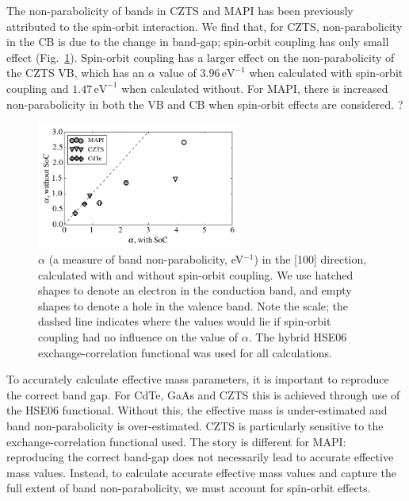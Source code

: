The non-parabolicity of bands in CZTS\autocite{Ito2015} and MAPI\autocite{Brivio2014,Mosconi2017} has been previously attributed to the spin-orbit interaction. 
We find that, for CZTS, non-parabolicity in the CB is due to the change in band-gap; spin-orbit coupling has only small effect (Fig.\ \ref{alpha_SoC}). 
Spin-orbit coupling has a larger effect on the non-parabolicity of the CZTS VB, which has an $\alpha$ value of $3.96\,\textrm{eV}^{-1}$ when calculated with spin-orbit coupling and $1.47\,\textrm{eV}^{-1}$ when calculated without. 
For MAPI, there is increased non-parabolicity in both the VB and CB when spin-orbit effects are considered. 
?
\begin{figure}[tb] \centering
\includegraphics[width=0.6\textwidth]{./figures/ch4/alpha_SoC.png}
\caption[Plot of band non-parabolicity with and without spin-orbit coupling]{\label{alpha_SoC}$\alpha$ (a measure of band non-parabolicity, eV$^{-1}$) in the [100] direction, calculated with and without spin-orbit coupling. We use hatched shapes to denote an electron in the conduction band, and empty shapes to denote a hole in the valence band. Note the scale; the dashed line indicates where the values would lie if spin-orbit coupling had no influence on the value of $\alpha$. The hybrid HSE06 exchange-correlation functional was used for all calculations. }
\end{figure}

To accurately calculate effective mass parameters, it is important to reproduce the correct band gap.
For CdTe, GaAs and CZTS this is achieved through use of the HSE06 functional.
Without this, the effective mass is under-estimated and band non-parabolicity is over-estimated.
CZTS is particularly sensitive to the exchange-correlation functional used.
The story is different for MAPI: 
reproducing the correct band-gap does not necessarily lead to accurate effective mass values.
Instead, to calculate accurate effective mass values and capture the full extent of band non-parabolicity, we must account for spin-orbit effects.

